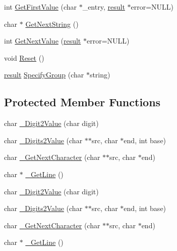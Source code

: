 \begin{DoxyCompactItemize}
\item 
int \hyperlink{classInifile_a874d03d73ed88186a79e86fb79876fc9}{Get\-First\-Value} (char $\ast$\-\_\-entry, \hyperlink{classInifile_a42a1cfa6fc8618c8b28d449626f0ecde}{result} $\ast$error=N\-U\-L\-L)
\item 
char $\ast$ \hyperlink{classInifile_a4c5de25933bf036015d5117a51c2c1c1}{Get\-Next\-String} ()
\item 
int \hyperlink{classInifile_a9b1541b9acc9d672190c8d86428647fc}{Get\-Next\-Value} (\hyperlink{classInifile_a42a1cfa6fc8618c8b28d449626f0ecde}{result} $\ast$error=N\-U\-L\-L)
\item 
void \hyperlink{classInifile_a8184de31b799ff84d413c4d474d43c53}{Reset} ()
\item 
\hyperlink{classInifile_a42a1cfa6fc8618c8b28d449626f0ecde}{result} \hyperlink{classInifile_a04cdffb13677cd560b1e2aeac74cd200}{Specify\-Group} (char $\ast$string)
\end{DoxyCompactItemize}
\subsection*{Protected Member Functions}
\begin{DoxyCompactItemize}
\item 
char \hyperlink{classInifile_a0ce7414130fe0e8133e050870ac8a64e}{\-\_\-\-Digit2\-Value} (char digit)
\item 
char \hyperlink{classInifile_a44dbf3a265dda32c1575da23ab5c62cc}{\-\_\-\-Digits2\-Value} (char $\ast$$\ast$src, char $\ast$end, int base)
\item 
char \hyperlink{classInifile_ae35b07dd314eba6045b7bbde1fecb654}{\-\_\-\-Get\-Next\-Character} (char $\ast$$\ast$src, char $\ast$end)
\item 
char $\ast$ \hyperlink{classInifile_a9467c2d8a51350310210cbd75faa5522}{\-\_\-\-Get\-Line} ()
\item 
char \hyperlink{classInifile_a0ce7414130fe0e8133e050870ac8a64e}{\-\_\-\-Digit2\-Value} (char digit)
\item 
char \hyperlink{classInifile_a44dbf3a265dda32c1575da23ab5c62cc}{\-\_\-\-Digits2\-Value} (char $\ast$$\ast$src, char $\ast$end, int base)
\item 
char \hyperlink{classInifile_ae35b07dd314eba6045b7bbde1fecb654}{\-\_\-\-Get\-Next\-Character} (char $\ast$$\ast$src, char $\ast$end)
\item 
char $\ast$ \hyperlink{classInifile_a15695f0103c901b9dcece2c29595f911}{\-\_\-\-Get\-Line} ()
\end{DoxyCompactItemize}
